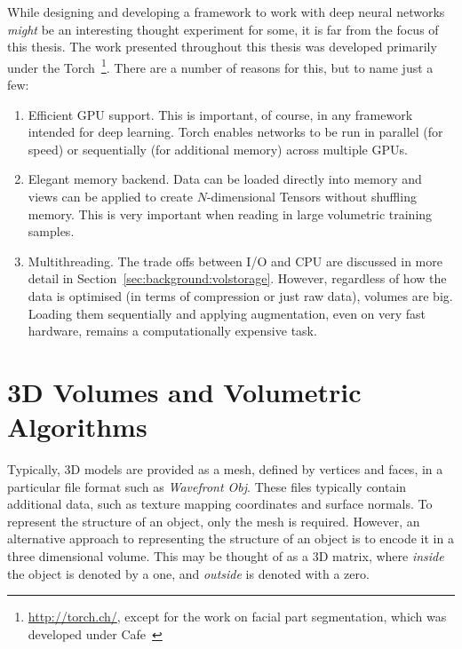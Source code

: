 While designing and developing a framework to work with deep neural
networks \textit{might} be an interesting thought experiment for some,
it is far from the focus of this thesis. The work presented throughout
this thesis was developed primarily under the
Torch~\footnote{\url{http://torch.ch/}, except for the work on facial
  part segmentation, which was developed under
  Cafe~\cite{jia2014caffe}}. There are a number of reasons for this,
but to name just a few:

\begin{enumerate}
\item Efficient GPU support. This is important, of course, in any
  framework intended for deep learning. Torch enables networks to be
  run in parallel (for speed) or sequentially (for additional memory)
  across multiple GPUs.
\item Elegant memory backend. Data can be loaded directly into memory
  and views can be applied to create $N$-dimensional Tensors without
  shuffling memory. This is very important when reading in large
  volumetric training samples.
\item Multithreading. The trade offs between I/O and CPU are discussed
  in more detail in Section~\ref{sec:background:volstorage}. However,
  regardless of how the data is optimised (in terms of compression or
  just raw data), volumes are big. Loading them sequentially and
  applying augmentation, even on very fast hardware, remains a
  computationally expensive task.
\end{enumerate}


\section{3D Volumes and Volumetric Algorithms}
\label{sec:background:volumes}

Typically, 3D models are provided as a mesh, defined by vertices and
faces, in a particular file format such as \textit{Wavefront
  Obj}. These files typically contain additional data, such as texture
mapping coordinates and surface normals. To represent the structure of
an object, only the mesh is required. However, an alternative approach
to representing the structure of an object is to encode it in a three
dimensional volume. This may be thought of as a 3D matrix, where
\textit{inside} the object is denoted by a one, and \textit{outside}
is denoted with a zero.

